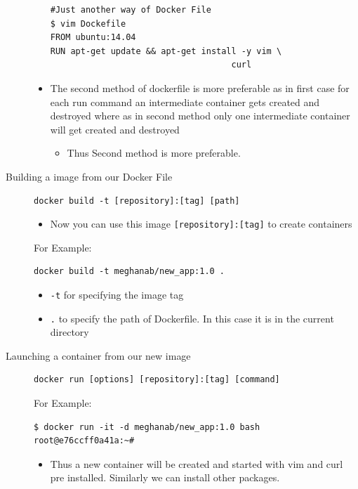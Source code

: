 \documentclass[11pt]{article}
\begin{document}
\begin{description}
\begin{itemize}
\begin{verbatim}
#Just another way of Docker File
$ vim Dockefile
FROM ubuntu:14.04
RUN apt-get update && apt-get install -y vim \
                                    curl
\end{verbatim}
\item The second method of dockerfile is more preferable as in first case for each run
command an intermediate container gets created and destroyed where as in
second method only one intermediate container will get created and destroyed
\begin{itemize}
\item Thus Second method is more preferable.
\end{itemize}
\end{itemize}
\item[{Building a image from our Docker File}] \begin{verbatim}
docker build -t [repository]:[tag] [path]
\end{verbatim}
\begin{itemize}
\item Now you can use this image \texttt{[repository]:[tag]} to create containers
\end{itemize}
For Example:
\begin{verbatim}
docker build -t meghanab/new_app:1.0 .
\end{verbatim}
\begin{itemize}
\item \texttt{-t} for specifying the image tag
\item \texttt{.} to specify the path of Dockerfile. In this case it is in the current directory
\end{itemize}
\item[{Launching a container from our new image}] \begin{verbatim}
docker run [options] [repository]:[tag] [command]
\end{verbatim}
For Example:
\begin{verbatim}
$ docker run -it -d meghanab/new_app:1.0 bash
root@e76ccff0a41a:~#
\end{verbatim}
\begin{itemize}
\item Thus a new container will be created and started with vim and curl pre
installed. Similarly we can install other packages.
\end{itemize}
\end{description}
\end{document}
